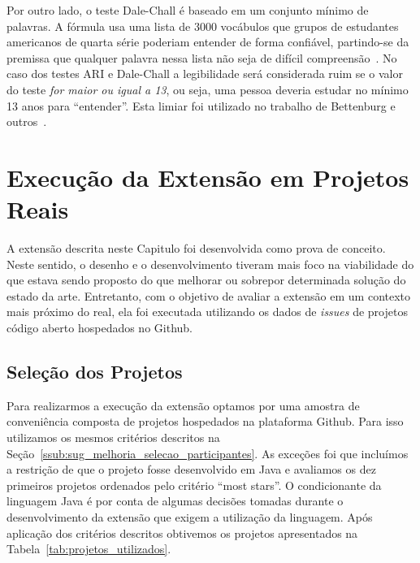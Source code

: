 Por outro lado, o teste Dale-Chall é baseado em um conjunto mínimo de palavras.
A fórmula usa uma lista de 3000 vocábulos que grupos de estudantes americanos de
quarta série poderiam entender de forma confiável, partindo-se da premissa que
qualquer palavra nessa lista não seja de difícil
compreensão~\cite{dale1948formula}. No caso dos testes ARI e Dale-Chall a
legibilidade será considerada ruim se o valor do teste \textit{for maior ou
    igual a 13}, ou seja, uma pessoa deveria estudar no mínimo 13 anos para
``entender''. Esta limiar foi utilizado no trabalho de Bettenburg e
outros~\cite{bettenburg2008makes}.

\section{Execução da Extensão em Projetos Reais}
\label{sec:avaliando_a_extensao_proposta}

A extensão descrita neste Capitulo foi desenvolvida como prova de conceito.
Neste sentido, o desenho e o desenvolvimento tiveram mais foco na viabilidade do
que estava sendo proposto do que melhorar ou sobrepor determinada solução do
estado da arte. Entretanto, com o objetivo de avaliar a extensão em um contexto
mais próximo do real, ela foi executada utilizando os dados de \textit{issues}
de projetos código aberto hospedados no Github.

\subsection{Seleção dos Projetos}
\label{sub:implementacao_selecao_projetos}

Para realizarmos a execução da extensão optamos por uma amostra de conveniência
composta de projetos hospedados na plataforma Github. Para isso utilizamos os
mesmos critérios descritos na
Seção~\ref{ssub:sug_melhoria_selecao_participantes}. As exceções foi que
incluímos a restrição de que o projeto fosse desenvolvido em Java e avaliamos os
dez primeiros projetos ordenados pelo critério ``most stars''. O condicionante
da linguagem Java é por conta de algumas decisões tomadas durante o
desenvolvimento da extensão que exigem a utilização da linguagem. Após aplicação
dos critérios descritos obtivemos os projetos apresentados na
Tabela~\ref{tab:projetos_utilizados}.

\begin{table}[htpb]
\centering
{}
\caption{Projetos utilizados no testes de execução da extensão. Os dados
    apresentados tem como referência 23/04/2017.}
\label{tab:projetos_utilizados}
\end{table}

